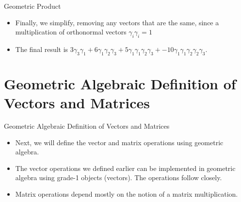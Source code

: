 \documentclass[aspectratio=169,xcolor=dvipsnames]{beamer}
\begin{document}
\begin{frame}{Geometric Product}
\begin{itemize}
      \item<2> Finally, we simplify, removing any vectors that are the same, since
            a multiplication of orthonormal vectors $\gamma_i\gamma_i = 1$
      \item<2> The final result is $3\gamma_3\gamma_1 + 6\gamma_1\gamma_2\gamma_3 + 5\gamma_1\gamma_1\gamma_2\gamma_3 + -10\gamma_1\gamma_1\gamma_2\gamma_2\gamma_3$.

\end{itemize}
\end{frame}
      



\section{Geometric Algebraic Definition of Vectors and Matrices}

\begin{frame}{Geometric Algebraic Definition of Vectors and Matrices}
    \begin{itemize}
      \item Next, we will define the vector and matrix operations using geometric
            algebra.
      \item The vector operations we defined earlier can be implemented in geometric 
            algebra using grade-1 objects (vectors). The operations follow closely.
      \item Matrix operations depend mostly on the notion of a matrix multiplication.
    \end{itemize}
\end{frame}
\end{document}

